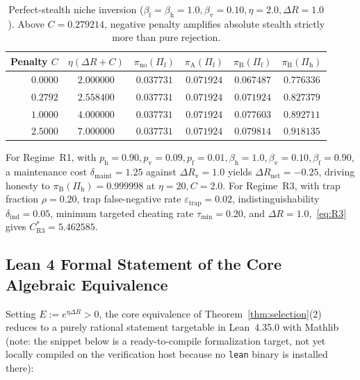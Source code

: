 \documentclass[11pt,a4paper]{article}
\begin{document}
\begin{table}[ht]
\centering
\caption{Perfect-stealth niche inversion ($\beta_{\mathrm{f}} = \beta_{\mathrm{h}} = 1.0, \beta_{\mathrm{v}} = 0.10, \eta = 2.0, \Delta R = 1.0$). Above $C = 0.279214$, negative penalty amplifies absolute stealth strictly more than pure rejection.}
\label{tab:niche}
\small
\begin{tabular}{@{}rccccc@{}}
\toprule
Penalty $C$ & $\eta(\Delta R + C)$ & $\pi_{\mathrm{no}}(\Pi_{\mathrm{f}})$ & $\pi_{\mathrm{A}}(\Pi_{\mathrm{f}})$ & $\pi_{\mathrm{B}}(\Pi_{\mathrm{f}})$ & $\pi_{\mathrm{B}}(\Pi_{\mathrm{h}})$ \\
\midrule
$0.0000$ & $2.000000$ & $0.037731$ & $0.071924$ & $0.067487$ & $0.776336$ \\
$\mathbf{0.2792}$ & $\mathbf{2.558400}$ & $0.037731$ & $\mathbf{0.071924}$ & $\mathbf{0.071924}$ & $0.827379$ \\
$1.0000$ & $4.000000$ & $0.037731$ & $0.071924$ & $0.077603$ & $0.892711$ \\
$2.5000$ & $7.000000$ & $0.037731$ & $0.071924$ & $\mathbf{0.079814}$ & $0.918135$ \\
\bottomrule
\end{tabular}
\end{table}

For Regime~R1, with $p_{\mathrm{h}} = 0.90, p_{\mathrm{v}} = 0.09, p_{\mathrm{f}} = 0.01, \beta_{\mathrm{h}} = 1.0, \beta_{\mathrm{v}} = 0.10, \beta_{\mathrm{f}} = 0.90$, a maintenance cost $\delta_{\mathrm{maint}} = 1.25$ against $\Delta R_{\mathrm{v}} = 1.0$ yields $\Delta R_{\mathrm{net}} = -0.25$, driving honesty to $\pi_{\mathrm{B}}(\Pi_{\mathrm{h}}) = 0.999998$ at $\eta = 20, C = 2.0$. For Regime~R3, with trap fraction $\rho = 0.20$, trap false-negative rate $\varepsilon_{\mathrm{trap}} = 0.02$, indistinguishability $\delta_{\mathrm{ind}} = 0.05$, minimum targeted cheating rate $\tau_{\min} = 0.20$, and $\Delta R = 1.0$,~\eqref{eq:R3} gives $C_{\mathrm{R3}}^* = 5.462585$.

\subsection{Lean 4 Formal Statement of the Core Algebraic Equivalence}

Setting $E := e^{\eta \Delta R} > 0$, the core equivalence of Theorem~\ref{thm:selection}(2) reduces to a purely rational statement targetable in Lean~4.35.0 with Mathlib (note: the snippet below is a ready-to-compile formalization target, not yet locally compiled on the verification host because no \texttt{lean} binary is installed there):
\end{document}

